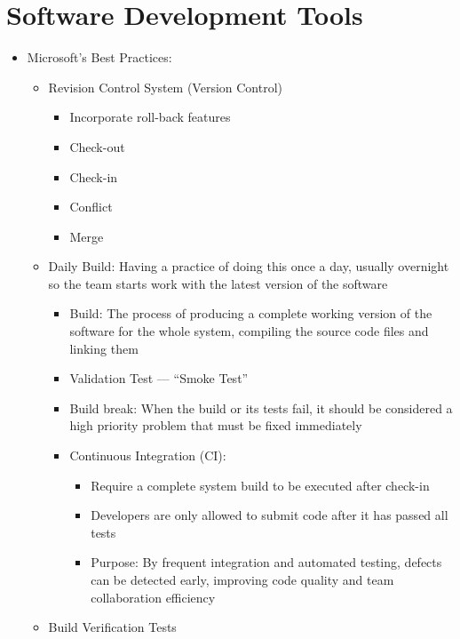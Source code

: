\documentclass[12pt,openany]{book}
\begin{document}
\section{Software Development Tools}
\begin{itemize}
    \item Microsoft's Best Practices:
    \begin{itemize}
        \item Revision Control System (Version Control)
        \begin{itemize}
            \item Incorporate roll-back features
            \item Check-out
            \item Check-in
            \item Conflict
            \item Merge
        \end{itemize}
        \item Daily Build: Having a practice of doing this once a day, usually overnight so the team starts work with the latest version of the software
        \begin{itemize}
            \item Build: The process of producing a complete working version of the software for the whole system, compiling the source code files and linking them
            \item Validation Test --- ``Smoke Test''
            \item Build break: When the build or its tests fail, it should be considered a high priority problem that must be fixed immediately
            \item Continuous Integration (CI):
            \begin{itemize}
                \item Require a complete system build to be executed after check-in
                \item Developers are only allowed to submit code after it has passed all tests
                \item Purpose: By frequent integration and automated testing, defects can be detected early, improving code quality and team collaboration efficiency
            \end{itemize}
        \end{itemize}      
        \item Build Verification Tests
        \begin{itemize}

\end{itemize}
\end{itemize}
\end{itemize}
\end{document}
